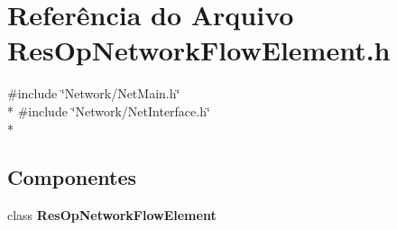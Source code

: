 \section{Referência do Arquivo Res\+Op\+Network\+Flow\+Element.\+h}
\label{_res_op_network_flow_element_8h}
{\ttfamily \#include \char`\"{}Network/\+Net\+Main.\+h\char`\"{}}\\*
{\ttfamily \#include \char`\"{}Network/\+Net\+Interface.\+h\char`\"{}}\\*
\subsection*{Componentes}
\begin{DoxyCompactItemize}
\item 
class {\bf Res\+Op\+Network\+Flow\+Element}
\end{DoxyCompactItemize}
